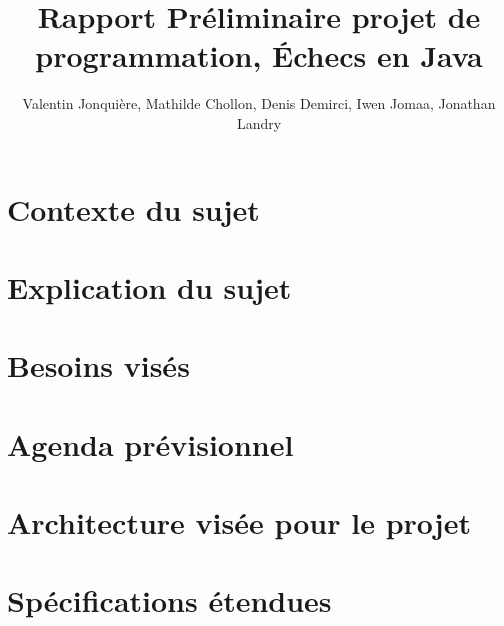 \documentclass{article}
\author{
    Valentin Jonquière,
    Mathilde Chollon,
    Denis Demirci,
    Iwen Jomaa,
    Jonathan Landry
}
\title{Rapport Préliminaire projet de programmation, Échecs en Java}
\begin{document}
\maketitle

\pagebreak

\tableofcontents

\pagebreak

\section{Contexte du sujet}

\section{Explication du sujet}

\section{Besoins visés}

\section{Agenda prévisionnel}

\section{Architecture visée pour le projet}

\section{Spécifications étendues}
\end{document}
